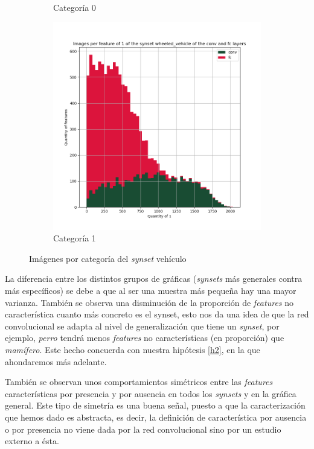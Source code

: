 \documentclass[12,twoside]{TFG-GM}
\theoremstyle{definition}
\theoremstyle{remark}
\begin{document}
\begin{figure}[ht]
\begin{subfigure}[b]{0.3\textwidth}
		\caption{Categoría 0}
	\end{subfigure}
	\begin{subfigure}[b]{0.3\textwidth}
		\includegraphics[width=\textwidth]  {Images/plots/25/synsets/Images_per_feature_of_1_category_wheeled_vehicleall_layers.png}
		\caption{Categoría 1}
	\end{subfigure}       
	\caption{Imágenes por categoría del \textit{synset} vehículo \label{fig:imagesperfeaturewheel}}
\end{figure}

La diferencia entre los distintos grupos de gráficas (\textit{synsets} más generales contra más específicos) se debe a que al ser una muestra más pequeña hay una mayor varianza. También se observa una disminución de la proporción de \textit{features} no característica cuanto más concreto es el synset, esto nos da una idea de que la red convolucional se adapta al nivel de generalización que tiene un \textit{synset}, por ejemplo, \textit{perro} tendrá menos \textit{features} no características (en proporción) que \textit{mamífero}. Este hecho concuerda con nuestra hipótesis \ref{h2}, en la que ahondaremos más adelante.

También se observan unos comportamientos simétricos entre las \textit{features} características por presencia y por ausencia en todos los \textit{synsets} y en la gráfica general. Este tipo de simetría es una buena señal, puesto a que la caracterización que hemos dado es abstracta, es decir, la definición de característica por ausencia o por presencia no viene dada por la red convolucional sino por un estudio externo a ésta.  
\end{document}
